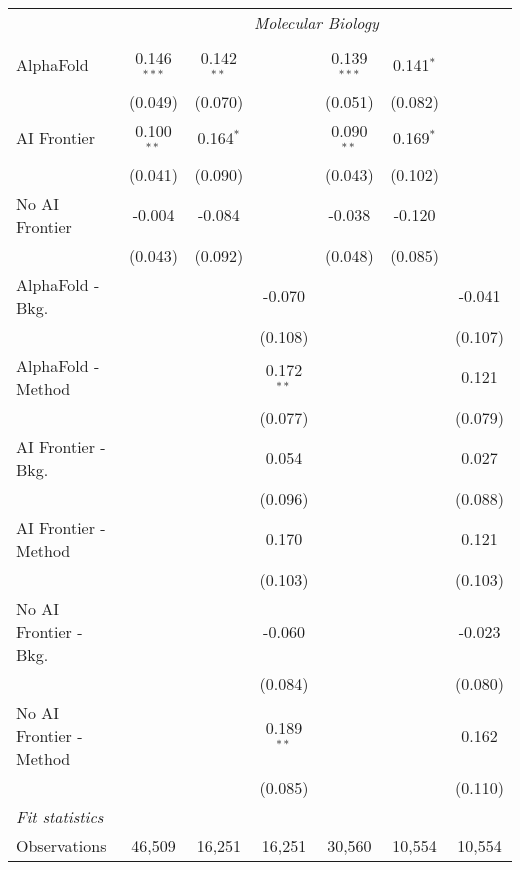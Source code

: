 \begin{tabular}{lcccccc}
 & \multicolumn{6}{c}{\textit{Molecular Biology}} \\ \\
   AlphaFold               & 0.146$^{***}$ & 0.142$^{**}$ &              & 0.139$^{***}$ & 0.141$^{*}$ &   \\   
                           & (0.049)       & (0.070)      &              & (0.051)       & (0.082)     &   \\   
   AI Frontier             & 0.100$^{**}$  & 0.164$^{*}$  &              & 0.090$^{**}$  & 0.169$^{*}$ &   \\   
                           & (0.041)       & (0.090)      &              & (0.043)       & (0.102)     &   \\   
   No AI Frontier          & -0.004        & -0.084       &              & -0.038        & -0.120      &   \\   
                           & (0.043)       & (0.092)      &              & (0.048)       & (0.085)     &   \\   
   AlphaFold - Bkg.        &               &              & -0.070       &               &             & -0.041\\   
                           &               &              & (0.108)      &               &             & (0.107)\\   
   AlphaFold - Method      &               &              & 0.172$^{**}$ &               &             & 0.121\\   
                           &               &              & (0.077)      &               &             & (0.079)\\   
   AI Frontier - Bkg.      &               &              & 0.054        &               &             & 0.027\\   
                           &               &              & (0.096)      &               &             & (0.088)\\   
   AI Frontier - Method    &               &              & 0.170        &               &             & 0.121\\   
                           &               &              & (0.103)      &               &             & (0.103)\\   
   No AI Frontier - Bkg.   &               &              & -0.060       &               &             & -0.023\\   
                           &               &              & (0.084)      &               &             & (0.080)\\   
   No AI Frontier - Method &               &              & 0.189$^{**}$ &               &             & 0.162\\   
                           &               &              & (0.085)      &               &             & (0.110)\\   
   \midrule
   \emph{Fit statistics}\\
   Observations            & 46,509        & 16,251       & 16,251       & 30,560        & 10,554      & 10,554\\  
   

\end{tabular}
